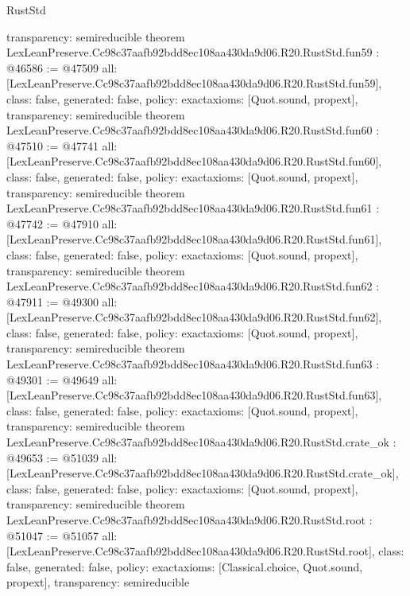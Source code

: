\begin{lexlean}{RustStd}
\begin{coremodule}
{  transparency: semireducible
}
theorem LexLeanPreserve.Cc98c37aafb92bdd8ec108aa430da9d06.R20.RustStd.fun59 : @46586 := @47509 {
  all: [LexLeanPreserve.Cc98c37aafb92bdd8ec108aa430da9d06.R20.RustStd.fun59],
  class: false,
  generated: false,
  policy: exact{axioms: [Quot.sound, propext]},
  transparency: semireducible
}
theorem LexLeanPreserve.Cc98c37aafb92bdd8ec108aa430da9d06.R20.RustStd.fun60 : @47510 := @47741 {
  all: [LexLeanPreserve.Cc98c37aafb92bdd8ec108aa430da9d06.R20.RustStd.fun60],
  class: false,
  generated: false,
  policy: exact{axioms: [Quot.sound, propext]},
  transparency: semireducible
}
theorem LexLeanPreserve.Cc98c37aafb92bdd8ec108aa430da9d06.R20.RustStd.fun61 : @47742 := @47910 {
  all: [LexLeanPreserve.Cc98c37aafb92bdd8ec108aa430da9d06.R20.RustStd.fun61],
  class: false,
  generated: false,
  policy: exact{axioms: [Quot.sound, propext]},
  transparency: semireducible
}
theorem LexLeanPreserve.Cc98c37aafb92bdd8ec108aa430da9d06.R20.RustStd.fun62 : @47911 := @49300 {
  all: [LexLeanPreserve.Cc98c37aafb92bdd8ec108aa430da9d06.R20.RustStd.fun62],
  class: false,
  generated: false,
  policy: exact{axioms: [Quot.sound, propext]},
  transparency: semireducible
}
theorem LexLeanPreserve.Cc98c37aafb92bdd8ec108aa430da9d06.R20.RustStd.fun63 : @49301 := @49649 {
  all: [LexLeanPreserve.Cc98c37aafb92bdd8ec108aa430da9d06.R20.RustStd.fun63],
  class: false,
  generated: false,
  policy: exact{axioms: [Quot.sound, propext]},
  transparency: semireducible
}
theorem LexLeanPreserve.Cc98c37aafb92bdd8ec108aa430da9d06.R20.RustStd.crate_ok : @49653 := @51039 {
  all: [LexLeanPreserve.Cc98c37aafb92bdd8ec108aa430da9d06.R20.RustStd.crate_ok],
  class: false,
  generated: false,
  policy: exact{axioms: [Quot.sound, propext]},
  transparency: semireducible
}
theorem LexLeanPreserve.Cc98c37aafb92bdd8ec108aa430da9d06.R20.RustStd.root : @51047 := @51057 {
  all: [LexLeanPreserve.Cc98c37aafb92bdd8ec108aa430da9d06.R20.RustStd.root],
  class: false,
  generated: false,
  policy: exact{axioms: [Classical.choice, Quot.sound, propext]},
  transparency: semireducible
}


\end{coremodule}
\end{lexlean}
